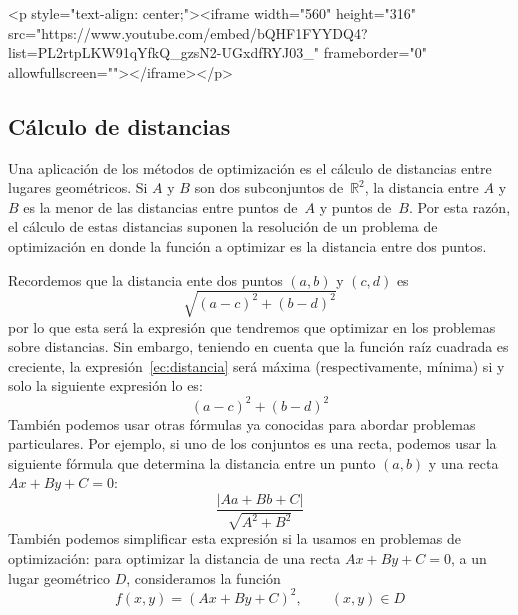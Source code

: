 \begin{rawhtml}
<p style="text-align: center;"><iframe width="560" height="316" src="https://www.youtube.com/embed/bQHF1FYYDQ4?list=PL2rtpLKW91qYfkQ_gzsN2-UGxdfRYJ03_" frameborder="0" allowfullscreen=""></iframe></p>
\end{rawhtml}
	

\subsection{Cálculo de distancias}

Una aplicación de los métodos de optimización es el cálculo de distancias entre lugares geométricos.
Si $A$ y $B$ son dos subconjuntos de~$\mathbb{R}^2$, la distancia entre $A$ y $B$ es la menor de las distancias entre puntos de~$A$ y puntos de~$B$.
Por esta razón, el cálculo de estas distancias suponen la resolución de un problema de optimización en donde la función a optimizar es la distancia entre dos puntos.
  
Recordemos que la distancia ente dos puntos $(a,b)$ y $(c,d)$ es
\begin{equation}\label{ec:distancia}
\sqrt{(a-c)^2+(b-d)^2}
\end{equation}
por lo que esta será la expresión que tendremos que optimizar en los problemas sobre distancias.
Sin embargo, teniendo en cuenta que la función raíz cuadrada es creciente, la expresión~\ref{ec:distancia} será máxima (respectivamente, mínima) si y solo la
siguiente expresión lo es:
\[
(a-c)^2+(b-\mathit d)^2
\]
También podemos usar otras fórmulas ya conocidas para abordar problemas particulares.
Por ejemplo, si uno de los conjuntos es una recta, podemos usar la siguiente fórmula que determina la distancia entre un  punto $(a,b)$ y una recta $Ax+By+C=0$:
\[
\frac{|Aa+Bb+C|}{\sqrt{A^2+B^2}}
\]
También podemos simplificar esta expresión si la usamos en problemas de optimización: para optimizar la distancia de una recta $Ax+By+C=0$, a un lugar geométrico $\mathit D$, consideramos la función
\[
f(x,y)=(Ax+By+C)^2,\qquad (x,y)\in\mathit D
\]

